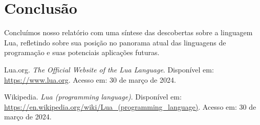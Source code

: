 \documentclass[12pt]{article}
\begin{document}
\section{Conclusão}
Concluímos nosso relatório com uma síntese das descobertas sobre a linguagem Lua, refletindo sobre sua posição no panorama atual das linguagens de programação e suas potenciais aplicações futuras.

\begin{thebibliography}{9}

 Lua.org. \textit{The Official Website of the Lua Language}. Disponível em: \url{https://www.lua.org}. Acesso em: 30 de março de 2024.

 Wikipedia. \textit{Lua (programming language)}. Disponível em: \url{https://en.wikipedia.org/wiki/Lua\_(programming\_language)}. Acesso em: 30 de março de 2024.

\end{thebibliography}
\end{document}
